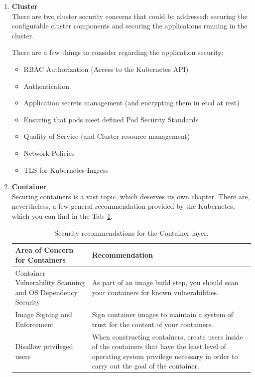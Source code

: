 \begin{enumerate}
\item \textbf{Cluster} \\
There are two cluster security concerns that could be addressed: securing the configurable cluster components and securing the applications running in the cluster.

There are a few things to consider regarding the application security:
\begin{itemize}
\item RBAC Authorization (Access to the Kubernetes API)
\item Authentication	
\item Application secrets management (and encrypting them in etcd at rest)
\item Ensuring that pods meet defined Pod Security Standards
\item Quality of Service (and Cluster resource management)
\item Network Policies
\item TLS for Kubernetes Ingress
\end{itemize}

\item \textbf{Container} \\
Securing containers is a vast topic, which deserves its own chapter. There are, nevertheless, a few general recommendation provided by the Kubernetes, which you can find in the Tab~\ref{tab:container-security-recommendations}.

\begin{table}[H]
    \begin{center}
        \begin{tabular}{ | p{} | p{} | } 
        \hline
        \textbf{Area of Concern for Containers} & \textbf{Recommendation} \\ 
        \hline
        Container Vulnerability Scanning and OS Dependency Security & As part of an image build step, you should scan your containers for known vulnerabilities. \\ 
        \hline
        Image Signing and Enforcement & Sign container images to maintain a system of trust for the content of your containers. \\ 
        \hline
        Disallow privileged users & When constructing containers, create users inside of the containers that have the least level of operating system privilege necessary in order to carry out the goal of the container. \\
        \hline
        \end{tabular}
    \end{center}
    \caption{Security recommendations for the Container layer.}
    \label{tab:container-security-recommendations}
\end{table}


\end{enumerate}
